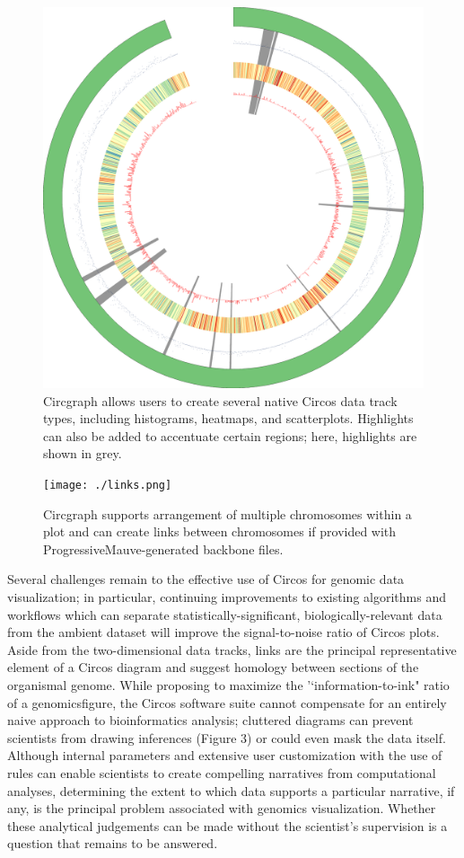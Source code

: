\documentclass{article}
\begin{document}
\begin{figure}[H]
\centering
\includegraphics[scale=0.1]{./results/hilite.png}
\caption{Circgraph allows users to create several native Circos data track types, including histograms, heatmaps, and scatterplots. Highlights can also be added to accentuate certain regions; here, highlights are shown in grey.}
\end{figure}

\begin{figure}[H]
\centering
\texttt{[image: ./links.png]}
\caption{Circgraph supports arrangement of multiple chromosomes within a plot and can create links between chromosomes if provided with ProgressiveMauve-generated backbone files.}
\end{figure}

Several challenges remain to the effective use of Circos for genomic data visualization; in particular, continuing improvements to existing algorithms and workflows which can separate statistically-significant, biologically-relevant data from the ambient dataset will improve the signal-to-noise ratio of Circos plots. Aside from the two-dimensional data tracks, links are the principal representative element of a Circos diagram and suggest homology between sections of the organismal genome. While proposing to maximize the '`information-to-ink" ratio of a genomicsfigure, the Circos software suite cannot compensate for an entirely naive approach to bioinformatics analysis; cluttered diagrams can prevent scientists from drawing inferences (Figure 3) or could even mask the data itself. Although internal parameters and extensive user customization with the use of rules can enable scientists to create compelling narratives from computational analyses, determining the extent to which data supports a particular narrative, if any, is the principal problem associated with genomics visualization. Whether these analytical judgements can be made without the scientist's supervision is a question that remains to be answered.
\end{document}
